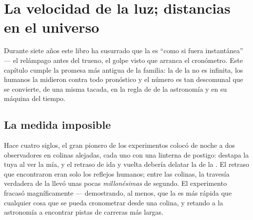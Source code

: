 \chapter{La velocidad de la luz; distancias en el universo}\label{ch:g8:speed-of-light}

Durante siete años este libro ha susurrado que la  es ``como si
fuera instantánea'' --- el relámpago antes del trueno, el golpe visto
que arranca el cronómetro. Este capítulo cumple la promesa más antigua
de la familia: la  de la  no es infinita, los
humanos la midieron contra todo pronóstico y el número es tan
descomunal que se convierte, de una misma tacada, en la regla de 
de la astronomía y en su máquina del tiempo.

\section{La medida imposible}

\begin{example}\label{ex:g8:speed-of-light:galileo}
Hace cuatro siglos, el gran pionero de los experimentos colocó de noche
a dos observadores en colinas alejadas, cada uno con una linterna de
postigo: destapa la tuya al ver la mía, y el retraso de ida y vuelta
debería delatar la  de la . El retraso que
encontraron eran solo los reflejos humanos; entre las colinas, la
travesía verdadera de la  llevó unas pocas \emph{millonésimas}
de segundo. El experimento fracasó magníficamente --- demostrando, al
menos, que la  es más rápida que cualquier cosa que se pueda
cronometrar desde una colina, y retando a la astronomía a encontrar
pistas de carreras más largas.
\end{example}

